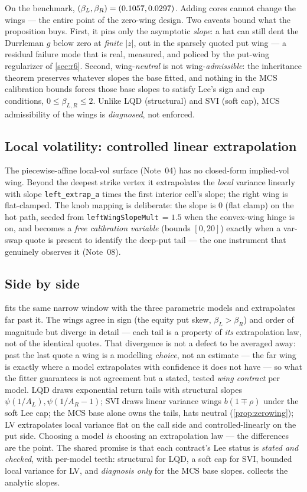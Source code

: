 \documentclass[11pt]{article}
\begin{document}
On the benchmark, $(\beta_L,\beta_R)=(0.1057,0.0297)$. Adding cores
cannot change the wings --- the entire point of the zero-wing design. Two
caveats bound what the proposition buys. First, it pins only the asymptotic
\emph{slope}: a hat can still dent the Durrleman $g$ below zero at
\emph{finite} $|z|$, out in the sparsely quoted put wing --- a residual
failure mode that is real, measured, and policed by the put-wing regularizer
of \cref{sec:r6}. Second, wing-\emph{neutral} is not wing-\emph{admissible}:
the inheritance theorem preserves whatever slopes the base fitted, and
nothing in the MCS calibration bounds forces those base slopes to satisfy
Lee's sign and cap conditions, $0\le\beta_{L,R}\le2$. Unlike LQD (structural)
and SVI (soft cap), MCS admissibility of the wings is \emph{diagnosed}, not
enforced.

\subsection{Local volatility: controlled linear extrapolation}

The piecewise-affine local-vol surface (Note~04) has no closed-form
implied-vol wing. Beyond the deepest strike vertex it extrapolates the
\emph{local} variance linearly with slope \texttt{left\_extrap\_a} times the
first interior cell's slope; the right wing is flat-clamped. The knob mapping
is deliberate: the slope is $0$ (flat clamp) on the hot path, seeded from
\texttt{leftWingSlopeMult}$\,=1.5$ when the convex-wing hinge is on, and
becomes a \emph{free calibration variable} (bounds $[0,20]$) exactly when a
var-swap quote is present to identify the deep-put tail --- the one
instrument that genuinely observes it (Note~08).

\subsection{Side by side}

 fits the same narrow window with the three parametric
models and extrapolates far past it. The wings agree in sign (the equity put
skew, $\beta_L>\beta_R$) and order of magnitude but diverge in detail ---
each tail is a property of \emph{its} extrapolation law, not of the identical
quotes. That divergence is not a defect to be averaged away: past the last
quote a wing is a modelling \emph{choice}, not an estimate --- the far wing is
exactly where a model extrapolates with confidence it does not have --- so
what the fitter guarantees is not agreement but a stated, tested \emph{wing
contract} per model. LQD draws exponential return tails with structural
slopes $\psi(1/A_L),\psi(1/A_R-1)$; SVI draws linear variance wings
$b(1\mp\rho)$ under the soft Lee cap; the MCS base alone owns the tails, hats
neutral (\cref{prop:zerowing}); LV extrapolates local variance flat on the
call side and controlled-linearly on the put side. Choosing a model \emph{is}
choosing an extrapolation law --- the differences are the point. The shared
promise is that each contract's Lee status is \emph{stated and checked},
with per-model teeth: structural for LQD, a soft cap for SVI, bounded local
variance for LV, and \emph{diagnosis only} for the MCS base slopes.
 collects the analytic slopes.
\end{document}
